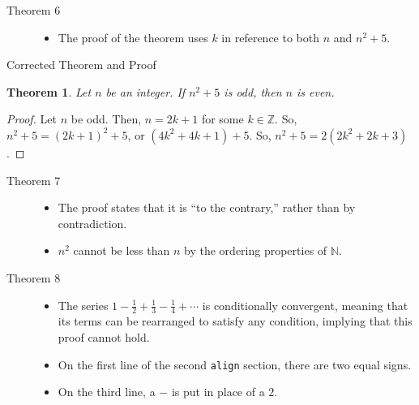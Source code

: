 \documentclass[10pt]{extarticle}
\newtheorem{theorem}{Theorem}
\newcommand{\N}{\mathbb{N}}
\newcommand{\Z}{\mathbb{Z}}
\begin{document}
  \begin{description}
    \item[Theorem 6]\hfill
      \begin{itemize}
        \item The proof of the theorem uses $k$ in reference to both $n$ and $n^2 + 5$.
      \end{itemize}
  \end{description}
  \begin{problem}{Corrected Theorem and Proof}
    \begin{theorem}
      Let $n$ be an integer. If $n^2 + 5$ is odd, then $n$ is even.
    \end{theorem}
    \begin{proof}
      Let $n$ be odd. Then, $n = 2k + 1$ for some $k\in\Z$. So, $n^2 + 5 = (2k+1)^2 + 5$, or $(4k^2 + 4k + 1) + 5$. So, $n^2 + 5 = 2(2k^2 + 2k + 3)$.
    \end{proof}
  \end{problem}
  \begin{description}
    \item[Theorem 7] \hfill
      \begin{itemize}
        \item The proof states that it is ``to the contrary,'' rather than by contradiction.
        \item $n^2$ cannot be less than $n$ by the ordering properties of $\N$.
      \end{itemize}
  \end{description}
  \begin{description}
    \item[Theorem 8]\hfill
      \begin{itemize}
        \item The series $1 - \frac{1}{2} + \frac{1}{3} - \frac{1}{4} + \cdots$ is conditionally convergent, meaning that its terms can be rearranged to satisfy any condition, implying that this proof cannot hold.
        \item On the first line of the second \verb|align| section, there are two equal signs.
        \item On the third line, a $-$ is put in place of a $2$.
      \end{itemize}
  \end{description}
\end{document}
